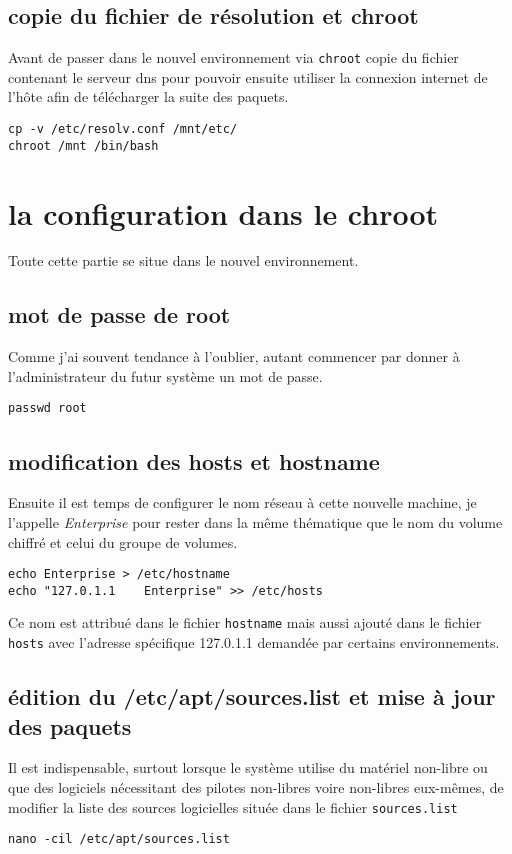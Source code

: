\documentclass[12pt, a4paper]{article}
\begin{document}
\subsection{copie du fichier de résolution et chroot}
Avant de passer dans le nouvel environnement via \texttt{chroot} copie du fichier contenant le serveur dns pour pouvoir ensuite utiliser la connexion internet de l'hôte afin de télécharger la suite des paquets.
\begin{verbatim}
cp -v /etc/resolv.conf /mnt/etc/
chroot /mnt /bin/bash
\end{verbatim}

\section{la configuration dans le chroot}
Toute cette partie se situe dans le nouvel environnement.

\subsection{mot de passe de root}
Comme j'ai souvent tendance à l'oublier, autant commencer par donner à l'administrateur du futur système un mot de passe.
\begin{verbatim}
passwd root
\end{verbatim}

\subsection{modification des hosts et hostname}
Ensuite il est temps de configurer le nom réseau à cette nouvelle machine, je l'appelle \emph{Enterprise\/} pour rester dans la même thématique que le nom du volume chiffré et celui du groupe de volumes.
\begin{verbatim}
echo Enterprise > /etc/hostname
echo "127.0.1.1    Enterprise" >> /etc/hosts
\end{verbatim}
Ce nom est attribué dans le fichier \texttt{hostname} mais aussi ajouté dans le fichier \texttt{hosts} avec l'adresse spécifique 127.0.1.1 demandée par certains environnements.

\subsection{édition du /etc/apt/sources.list et mise à jour des paquets}
Il est indispensable, surtout lorsque le système utilise du matériel non-libre ou que des logiciels nécessitant des pilotes non-libres voire non-libres eux-mêmes, de modifier la liste des sources logicielles située dans le fichier \texttt{sources.list} 
\begin{verbatim}
nano -cil /etc/apt/sources.list
\end{verbatim}
\end{document}

